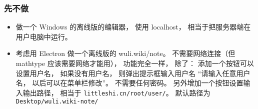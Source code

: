 \subsubsection{先不做}
\begin{itemize}
\item 做一个 Windows 的离线版的编辑器， 使用 localhost， 相当于把服务器端在用户电脑中运行。

\item 考虑用 Electron 做一个离线版的 wuli.wiki/note。 不需要网络连接（但 mathtype 应该需要网络才能用）， 功能完全一样， 除了： 添加一个按钮可以设置用户名， 如果没有用户名， 则弹出提示框输入用户名 “请输入任意用户名， 以后可以在菜单栏修改”。 不需要任何密码。 另外增加一个按钮设置输入输出路径， 相当于 \verb`littleshi.cn/root/user/`。 默认路径为 \verb`Desktop/wuli.wiki-note/`
\end{itemize}

